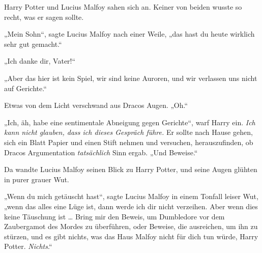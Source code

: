 
Harry Potter und Lucius Malfoy sahen sich an. Keiner von beiden wusste so recht, was er sagen sollte.

„Mein Sohn“, sagte Lucius Malfoy nach einer Weile, „das hast du heute wirklich sehr gut gemacht.“

„Ich danke dir, Vater!“

„Aber das hier ist kein Spiel, wir sind keine Auroren, und wir verlassen uns nicht auf Gerichte.“

Etwas von dem Licht verschwand aus Dracos Augen.
„Oh.“

„Ich, äh, habe eine sentimentale Abneigung gegen Gerichte“, warf Harry ein.
\emph{Ich kann nicht glauben, dass ich dieses Gespräch führe.} Er sollte nach Hause gehen, sich ein Blatt Papier und einen Stift nehmen und versuchen, herauszufinden, ob Dracos Argumentation \emph{tatsächlich} Sinn ergab.
„Und Beweise.“

Da wandte Lucius Malfoy seinen Blick zu Harry Potter, und seine Augen glühten in purer grauer Wut.

„Wenn du mich getäuscht hast“, sagte Lucius Malfoy in einem Tonfall leiser Wut, „wenn das alles eine Lüge ist, dann werde ich dir nicht verzeihen. Aber wenn dies keine Täuschung ist … Bring mir den Beweis, um Dumbledore vor dem Zaubergamot des Mordes zu überführen, oder Beweise, die ausreichen, um ihn zu stürzen, und es gibt nichts, was das Haus Malfoy nicht für dich tun würde, Harry Potter. \emph{Nichts}.“

